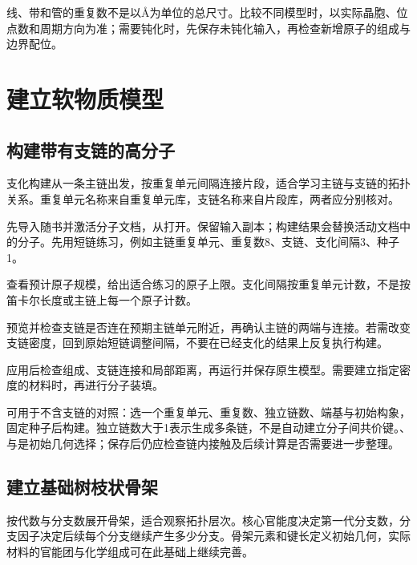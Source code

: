 线、带和管的重复数不是以\AA 为单位的总尺寸。比较不同模型时，以实际晶胞、位点数和周期方向为准；需要钝化时，先保存未钝化输入，再检查新增原子的组成与边界配位。

\FloatBarrier
\section{建立软物质模型}

\subsection{构建带有支链的高分子}\label{sec:branched-polymer-reference}

支化构建从一条主链出发，按重复单元间隔连接片段，适合学习主链与支链的拓扑关系。重复单元名称来自重复单元库，支链名称来自片段库，两者应分别核对。

\begin{steps}
  \item 先导入随书并激活分子文档，从打开。保留输入副本；构建结果会替换活动文档中的分子。先用短链练习，例如主链重复单元、重复数8、支链、支化间隔3、种子1。
  \item 查看预计原子规模，给出适合练习的原子上限。支化间隔按重复单元计数，不是按笛卡尔长度或主链上每一个原子计数。
  \item 预览并检查支链是否连在预期主链单元附近，再确认主链的两端与连接。若需改变支链密度，回到原始短链调整间隔，不要在已经支化的结果上反复执行构建。
  \item 应用后检查组成、支链连接和局部距离，再运行并保存原生模型。需要建立指定密度的材料时，再进行分子装填。
\end{steps}

可用于不含支链的对照：选一个重复单元、重复数、独立链数、端基与初始构象，固定种子后构建。独立链数大于1表示生成多条链，不是自动建立分子间共价键。、与是初始几何选择；保存后仍应检查链内接触及后续计算是否需要进一步整理。

\subsection{建立基础树枝状骨架}\label{sec:dendrimer-reference}

按代数与分支数展开骨架，适合观察拓扑层次。核心官能度决定第一代分支数，分支因子决定后续每个分支继续产生多少分支。骨架元素和键长定义初始几何，实际材料的官能团与化学组成可在此基础上继续完善。

